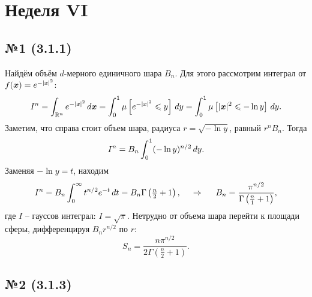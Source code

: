 \section{Неделя VI}





\subsection*{№1 (3.1.1)}

Найдём объём $d$-мерного единичного шара $B_n$. Для этого рассмотрим интеграл от $f(\vc{x}) = e^{-|\smallvc{x}|^2}$:
\begin{equation*}
    I^n = \int_{\mathbb{R}^n} e^{-|\smallvc{x}|^2} \d \vc{x} = \int_0^1 \mu\left[e^{-|\smallvc{x}|^2} \leq y\right] \d y = \int_{0}^{1} \mu\left[|\vc{x}|^2 \leq - \ln y\right] \d y.
\end{equation*}
Заметим, что справа стоит объем шара, радиуса $r = \sqrt{-\ln y}$, равный $r^{n} B_n$. Тогда
\begin{equation*}
    I^n = B_n \int_{0}^{1} (- \ln y)^{n/2} \, d y.  
\end{equation*}
Заменяя $- \ln y = t$, находим
\begin{equation*}
    I^n = B_n \int_{0}^{\infty} t^{n/2} e^{-t} \, d t = B_n \Gamma\left(\tfrac{n}{2}+1\right),
    \hspace{0.5cm} \Rightarrow \hspace{0.5cm}
    B_n = \frac{\pi^{n/2}}{\Gamma\left(\tfrac{n}{1}+1\right)},
\end{equation*}
где $I$ -- гауссов интеграл: $I = \sqrt{\pi}$. Нетрудно от объема шара перейти к площади сферы, дифференцируя $B_n r^{n/2}$ по $r$:
\begin{equation*}
    S_n = \frac{n \pi^{n/2}}{2 \Gamma\left(\tfrac{n}{2}+1\right)}.
\end{equation*}




\subsection*{№2 (3.1.3)}

